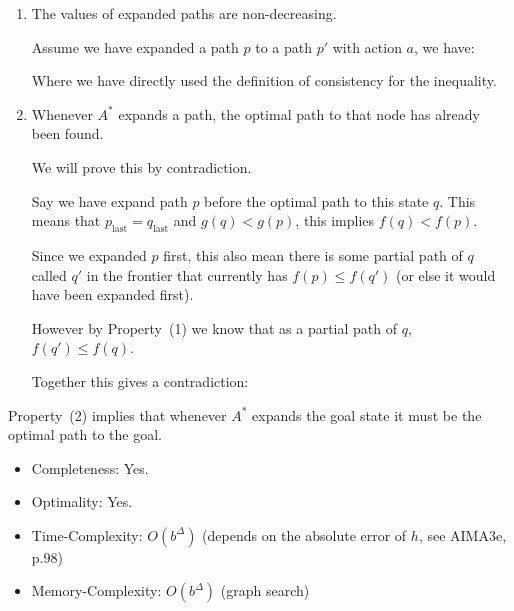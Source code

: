 \documentclass[10pt]{article}
\begin{document}
\begin{enumerate}
\item The values of expanded paths are non-decreasing.

Assume we have expanded a path $p$ to a path $p'$ with action $a$, we have:


\noindent Where we have directly used the definition of consistency for the inequality.

\item Whenever $A^*$ expands a path, the optimal path to that node has already been found. 

We will prove this by contradiction. 

Say we have expand path $p$ before the optimal path to this state $q$. This means that $p_{\mathrm{last}} =q_\mathrm{last}$ and  $g(q) < g(p)$, this implies $f(q) < f(p)$.

Since we expanded $p$ first, this also mean there is some partial path
of $q$ called $q'$ in the frontier that currently has $f(p) \leq f(q')$ (or else it
would have been expanded first).

However by Property~(1) we know that as a partial path of $q$, $f(q') \leq f(q)$. 

Together this gives a contradiction:




\end{enumerate}
\QED

\noindent Property~(2) implies that whenever $A^*$ expands the goal state it must be the optimal path to the goal.

\begin{itemize}
\item Completeness: Yes.  
\item Optimality: Yes. 
\item Time-Complexity: $O(b^\Delta)$ (depends on the absolute error of $h$, see AIMA3e, p.98)
\item Memory-Complexity: $O(b^\Delta)$ (graph search)
\end{itemize}
\end{document}
